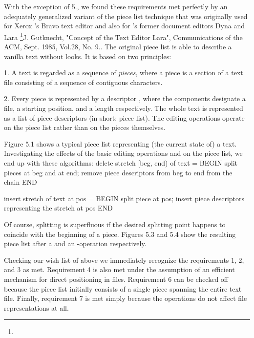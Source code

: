 \noindent With the exception of 5., we found these requirements met
perfectly by an adequately generalized variant of the piece list
technique that was originally used for Xerox 's Bravo text editor
and also for 's former document editors Dyna and Lara \footnote{{\mc[1]}}{J. Gutknecht, "Concept of the Text Editor Lara", Communications of the ACM, Sept. 1985, Vol.28, No. 9.}. The original piece list is able to describe a vanilla text without looks. It is based on two principles:

\item{1.} A text is regarded as a sequence of \emph{pieces}, where a piece is a section of a text file consisting of a sequence of contiguous characters.

\item{2.} Every piece is represented by a descriptor , where the components designate a file, a starting position, and a length respectively. The whole text is represented as a list of piece descriptors (in short: piece list). The editing operations operate on the piece list rather than on the pieces themselves.


Figure 5.1 shows a typical piece list representing (the current state
of) a text. Investigating the effects of the basic editing operations
 and  on the piece list, we end up with these algorithms:
\begintt
delete stretch [beg, end) of text = BEGIN
  split pieces at beg and at end;
  remove piece descriptors from beg to end from the chain
END
  
insert stretch of text at pos = BEGIN
  split piece at pos;
  insert piece descriptors representing the stretch at pos
END
\endtt

\noindent Of course, splitting is superfluous if the desired splitting point
happens to coincide with the beginning of a piece. Figures 5.3 and 5.4
show the resulting piece list after a  and an -operation
respectively.


Checking our wish list of above we immediately recognize the
requirements 1, 2, and 3 as met. Requirement 4 is also met
under the assumption of an efficient mechanism for direct positioning
in files. Requirement 6 can be checked off because the piece list
initially consists of a single piece spanning the entire text
file. Finally, requirement 7 is met simply because the operations do
not affect file representations at all.

